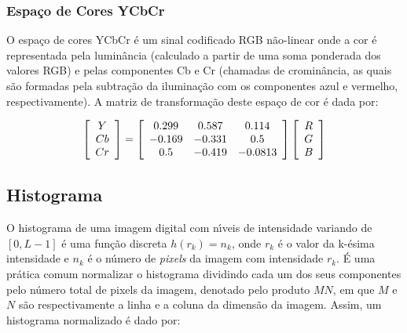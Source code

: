 \subsubsection{Espa\c{c}o de Cores YCbCr}

O espa\c{c}o de cores \ac{YCbCr} \'{e} um sinal codificado \ac{RGB} n\~{a}o-linear onde a cor \'{e} representada pela lumin\^{a}ncia (calculado a partir de uma soma ponderada dos valores RGB) e pelas componentes Cb e Cr (chamadas de cromin\^{a}ncia, as quais s\~{a}o formadas pela subtra\c{c}\~{a}o da ilumina\c{c}\~{a}o com os componentes azul e vermelho, respectivamente)\cite{GONZALEZ:2008}. A matriz de transforma\c{c}\~{a}o deste espa\c{c}o de cor \'{e} dada por:

\begin{equation}
\left[ {\begin{array}{*{20}c}
   Y  \\
   {Cb}  \\
   {Cr}  \\
\end{array}} \right] = \left[ {\begin{array}{*{20}c}
   {0.299} & {0.587} & {0.114}  \\
   { - 0.169} & { - 0.331} & {0.5}  \\
   {0.5} & { - 0.419} & { - 0.0813}  \\
\end{array}} \right]\left[ {\begin{array}{*{20}c}
   R  \\
   G  \\
   B  \\
\end{array}} \right]
\end{equation}

\subsection{Histograma}

O histograma de uma imagem digital com n\'{\i}veis de intensidade variando de $[0, L - 1]$ \'{e} uma fun\c{c}\~{a}o discreta $h(r_k) = n_k$, onde $r_k$ \'{e} o valor da k-\'{e}sima intensidade e $n_k$ \'{e} o n\'{u}mero de \emph{pixels} da imagem com intensidade $r_k$. \'{E} uma pr\'{a}tica comum normalizar o histograma dividindo cada um dos seus componentes pelo n\'{u}mero total de pixels da imagem, denotado pelo produto $MN$, em que $M$ e $N$ s\~{a}o respectivamente a linha e a coluna da dimens\~{a}o da imagem. Assim, um histograma normalizado \'{e} dado por:

